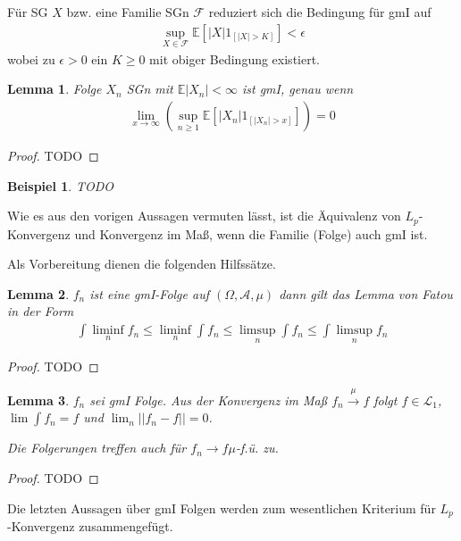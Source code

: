 \documentclass[]{article}
\newtheorem{lemma}{Lemma}
\newtheorem*{example}{Beispiel}
\begin{document}
Für SG $X$ bzw. eine Familie SGn $\mathcal{F}$ reduziert sich die Bedingung für gmI auf 
\begin{align*}
	\sup_{X\in\mathcal{F}} \mathbb{E}[|X| 1_{[|X|>K]}] < \epsilon
\end{align*}
wobei zu $\epsilon > 0 $ ein $K \geq 0$ mit obiger Bedingung existiert.

\begin{lemma}
	Folge $X_n$ SGn mit $\mathbb{E}|X_n| < \infty$ ist gmI, genau wenn
	\begin{align*}
		\lim\limits_{x\rightarrow\infty} (\sup_{n\geq 1} \mathbb{E}[|X_n| 1_{[|X_n|>x]}]) = 0
	\end{align*}
\end{lemma}

\begin{proof}
	TODO
\end{proof}

\begin{example}
	TODO
\end{example}

Wie es aus den vorigen Aussagen vermuten lässt, ist die Äquivalenz von $L_p$-Konvergenz und Konvergenz im Maß, wenn die Familie (Folge) auch gmI ist.

Als Vorbereitung dienen die folgenden Hilfssätze.

\begin{lemma}
	$f_n$ ist eine gmI-Folge auf $(\Omega, \mathcal{A}, \mu)$ dann gilt das Lemma von Fatou in der Form
	\begin{align*}
		\int \liminf_n f_n \leq \liminf_n \int f_n \leq \limsup_n \int f_n \leq \int \limsup_n f_n
	\end{align*}
\end{lemma}

\begin{proof}
	TODO
\end{proof}

\begin{lemma}
	$f_n$ sei gmI Folge. Aus der Konvergenz im Maß $f_n \xrightarrow{\mu} f$ folgt $f \in \mathcal{L}_1$, $\lim \int f_n = f$ und $\lim_n ||f_n - f|| = 0$.
	
	Die Folgerungen treffen auch für $f_n \rightarrow f \mu$-f.ü. zu.
\end{lemma}

\begin{proof}
	TODO
\end{proof}

Die letzten Aussagen über gmI Folgen werden zum wesentlichen Kriterium für $L_p$-Konvergenz zusammengefügt.
\end{document}
